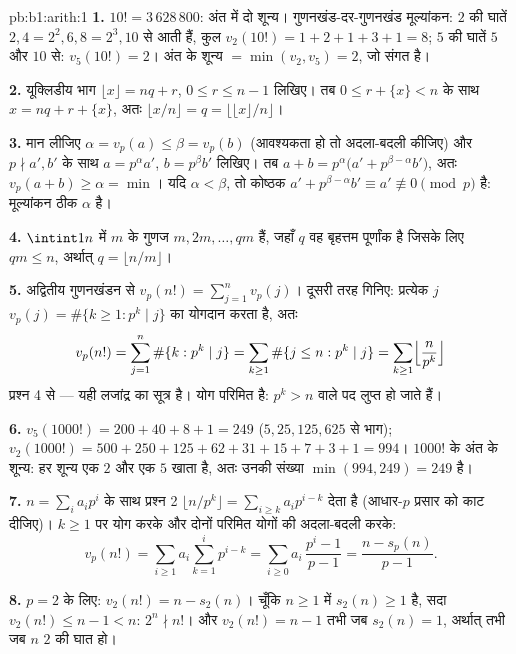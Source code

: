 \begin{solution}{pb:b1:arith:1}
\textbf{1.} $10! = 3\,628\,800$: अंत में दो शून्य। गुणनखंड-दर-गुणनखंड
मूल्यांकन: $2$ की घातें $2, 4 = 2^2, 6, 8 = 2^3, 10$ से आती हैं, कुल
$v_2(10!) = 1 + 2 + 1 + 3 + 1 = 8$; $5$ की घातें $5$ और $10$ से: $v_5(10!) =
2$। अंत के शून्य $= \min(v_2, v_5) = 2$, जो संगत है।

\textbf{2.} यूक्लिडीय भाग $\lfloor x\rfloor = nq + r$, $0 \leq r \leq n - 1$
लिखिए। तब $0 \leq r + \{x\} < n$ के साथ $x = nq + r + \{x\}$, अतः $\lfloor
x/n \rfloor = q = \bigl\lfloor \lfloor x \rfloor / n \bigr\rfloor$।

\textbf{3.} मान लीजिए $\alpha = v_p(a) \leq \beta = v_p(b)$ (आवश्यकता हो तो
अदला-बदली कीजिए) और $p \nmid a', b'$ के साथ $a = p^\alpha a'$, $b = p^\beta
b'$ लिखिए। तब $a + b = p^\alpha\bigl(a' + p^{\beta - \alpha}b'\bigr)$, अतः
$v_p(a + b) \geq \alpha = \min$। यदि $\alpha < \beta$, तो कोष्ठक $a' +
p^{\beta-\alpha}b' \equiv a' \not\equiv 0 \pmod p$ है: मूल्यांकन ठीक
$\alpha$ है।

\textbf{4.} $\intint1n$ में $m$ के गुणज $m, 2m, \dots, qm$ हैं, जहाँ $q$ वह
बृहत्तम पूर्णांक है जिसके लिए $qm \leq n$, अर्थात् $q = \lfloor n/m
\rfloor$।

\textbf{5.} अद्वितीय गुणनखंडन से $v_p(n!) = \sum_{j=1}^{n} v_p(j)$। दूसरी
तरह गिनिए: प्रत्येक $j$ $v_p(j) = \#\{k \geq 1 : p^k \mid j\}$ का योगदान
करता है, अतः
\[
v_p(n!) = \sum_{j=1}^n \#\{k : p^k \mid j\}
= \sum_{k\geq1} \#\{j \leq n : p^k \mid j\}
= \sum_{k\geq1} \Bigl\lfloor \frac n{p^k} \Bigr\rfloor
\]
प्रश्न 4 से --- यही लजांद्र का सूत्र है। योग परिमित है: $p^k > n$ वाले पद
लुप्त हो जाते हैं।

\textbf{6.} $v_5(1000!) = 200 + 40 + 8 + 1 = 249$ ($5, 25, 125, 625$ से
भाग); $v_2(1000!) = 500 + 250 + 125 + 62 + 31 + 15 + 7 + 3 + 1 = 994$।
$1000!$ के अंत के शून्य: हर शून्य एक $2$ और एक $5$ खाता है, अतः उनकी संख्या
$\min(994, 249) = 249$ है।

\textbf{7.} $n = \sum_i a_ip^i$ के साथ प्रश्न 2 $\lfloor n/p^k \rfloor =
\sum_{i \geq k} a_ip^{i-k}$ देता है (आधार-$p$ प्रसार को काट दीजिए)। $k \geq
1$ पर योग करके और दोनों परिमित योगों की अदला-बदली करके:
\[
v_p(n!) = \sum_{i\geq1} a_i \sum_{k=1}^{i} p^{i-k}
= \sum_{i\geq0} a_i\,\frac{p^i - 1}{p - 1}
= \frac{n - s_p(n)}{p - 1} .
\]

\textbf{8.} $p = 2$ के लिए: $v_2(n!) = n - s_2(n)$। चूँकि $n \geq 1$ में
$s_2(n) \geq 1$ है, सदा $v_2(n!) \leq n - 1 < n$: $2^n \nmid n!$। और
$v_2(n!) = n - 1$ तभी जब $s_2(n) = 1$, अर्थात् तभी जब $n$ $2$ की घात हो।


\end{solution}
